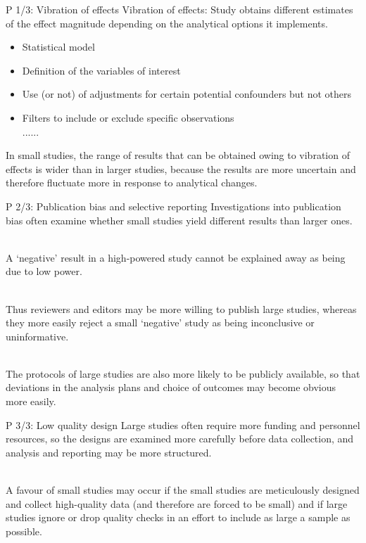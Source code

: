 \documentclass{beamer}
\begin{document}
	\begin{frame}{P 1/3: Vibration of effects}
		Vibration of effects: Study obtains different estimates of the effect magnitude depending on the analytical options it implements.
		
		\begin{itemize}
			\item Statistical model
			\item Definition of the variables of interest
			\item Use (or not) of adjustments for certain potential confounders but not others
			\item Filters to include or exclude specific observations
			~\\ ......
		\end{itemize}
		
		\fontsize{10pt}{12pt}\selectfont
		In small studies, the range of results that can be obtained owing to vibration of effects is wider than in larger studies, because the results are more uncertain and therefore fluctuate more in response to analytical changes.
	\end{frame}
	
	\begin{frame}{P 2/3: Publication bias and selective reporting}
		Investigations into publication bias often examine whether small studies yield different results than larger ones.
		
		~\\A ‘negative’ result in a high-powered study cannot be explained away as being due to low power. 
		
		~\\Thus reviewers and editors may be more willing to publish large studies, whereas they more easily reject a small ‘negative’ study as being inconclusive or uninformative.
		
		~\\The protocols of large studies are also more likely to be publicly available, so that deviations in the analysis plans and choice of outcomes may become obvious more easily.
	\end{frame}
	
	\begin{frame}{P 3/3: Low quality design}
		Large studies often require more funding and personnel resources, so the designs are examined more carefully before data collection, and analysis and reporting may be more structured.
		
		~\\A favour of small studies may occur if the small studies are meticulously designed and collect high-quality data (and therefore are forced to be small) and if large studies ignore or drop quality checks in an effort to include as large a sample as possible.
	\end{frame}
	
\end{document}

